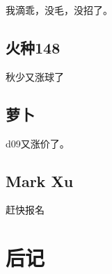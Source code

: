 \documentclass[12pt]{report}
\begin{document}
 我滴乖，没毛，没招了。
 
 \section*{火种148}
 
 秋少又涨球了
 
 \section*{萝卜}
 
 d09又涨价了。
 
 \section*{Mark Xu}
 
 赶快报名
 
 
 
 

   
   
   \clearpage %
   
   
   \tableofcontents %
   \clearpage %
   
	\setcounter{chapter}{0} 
	\clearpage
	
	\chapter*{后记}
	
	
\end{document}
